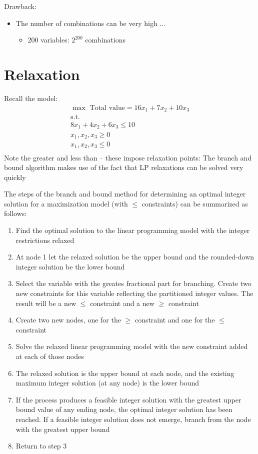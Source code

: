 \documentclass[10pt]{article}
\begin{document}
Drawback:
\begin{itemize}
    \item The number of combinations can be very high $\dots $
    \begin{itemize}
        \item 200 variables: $2^{200} $ combinations
    \end{itemize}
\end{itemize}
\newpage 
\section{Relaxation}
Recall the model: 
\begin{gather*}
    \max \text{ Total value} = 16x_1 + 7x_2 + 10x_3\\
    \text{s.t.}\\
    8x_1 + 4x_2 + 6x_3 \le 10\\
    x_1, x_2, x_3 \ge 0\\
    x_1, x_2, x_3 \le 0\\
\end{gather*}
Note the greater and less than -- these impose relaxation points: The branch and bound algorithm makes use of the fact that LP relaxations can be solved very quickly

The steps of the branch and bound method for determining an optimal integer solution for a maximization model (with $\le $ constraints) can be summarized as follows: 
\begin{enumerate}
    \item Find the optimal solution to the linear programming model with the integer restrictions relaxed 
    \item At node 1 let the relaxed solution be the upper bound and the rounded-down integer solution be the lower bound 
    \item Select the variable with the greates fractional part for branching. Create two new constraints for this variable reflecting the partitioned integer values. The result will be a new $\le $ constraint and a new $\ge $ constraint
    \item Create two new nodes, one for the $\ge $ constraint and one for the $\le $ constraint
    \item Solve the relaxed linear programming model with the new constraint added at each of those nodes 
    \item The relaxed solution is the upper bound at each node, and the existing maximum integer solution (at any node) is the lower bound 
    \item If the process produces a feasible integer solution with the greatest upper bound value of any ending node, the optimal integer solution has been reached. If a feasible integer solution does not emerge, branch from the node with the greatest upper bound 
    \item Return to step 3
\end{enumerate}
\newpage 
\end{document}
